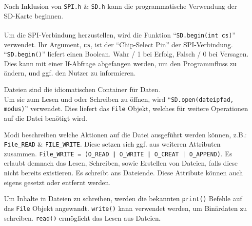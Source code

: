 \documentclass[ngerman]{schoolPres}
\begin{document}
  \begin{frame}[fragile]
    Nach Inklusion von \texttt{SPI.h} \& \texttt{SD.h} kann die programmatische Verwendung der SD-Karte beginnen.\\~\\

    Um die SPI-Verbindung herzustellen, wird die Funktion \enquote{\texttt{SD.begin(int cs)}} verwendet.
    Ihr Argument, \texttt{cs}, ist der \enquote{Chip-Select Pin} der SPI-Verbindung.
    \enquote{\texttt{SD.begin()}} liefert einen Boolean. Wahr / 1 bei Erfolg, Falsch / 0 bei Versagen.
    Dies kann mit einer If-Abfrage abgefangen werden, um den Programmfluss zu ändern, und ggf. den Nutzer zu informieren.


    
  \end{frame}

  \begin{frame}[fragile]
     {
      Dateien sind die idiomatischen Container für Daten.\\
      Um sie zum Lesen und oder Schreiben zu öffnen, wird \enquote{\texttt{SD.open(dateipfad, modus)}} verwendet.
      Dies liefert das \texttt{File} Objekt, welches für weitere Operationen auf die Datei benötigt wird.

    }

     {
      Modi beschreiben welche Aktionen auf die Datei ausgeführt werden können, z.B.: \texttt{File\_READ} \& \texttt{FILE\_WRITE}.
      Diese setzen sich ggf. aus weiteren Attributen zusammen. \texttt{File\_WRITE = (O\_READ | O\_WRITE | O\_CREAT | O\_APPEND)}.
      Es erlaubt demnach das Lesen, Schreiben, sowie Erstellen von Dateien, falls diese nicht bereits existieren. Es schreibt ans Dateiende.
      Diese Attribute können auch eigens gesetzt oder entfernt werden.

    }

     {
      Um Inhalte in Dateien zu schreiben, werden die bekannten \texttt{print()} Befehle auf das \texttt{File} Objekt angewandt.
      \texttt{write()} kann verwendet werden, um Binärdaten zu schreiben. \texttt{read()} ermöglicht das Lesen aus Dateien.

    }

    ~\\
    
  \end{frame}
\end{document}
